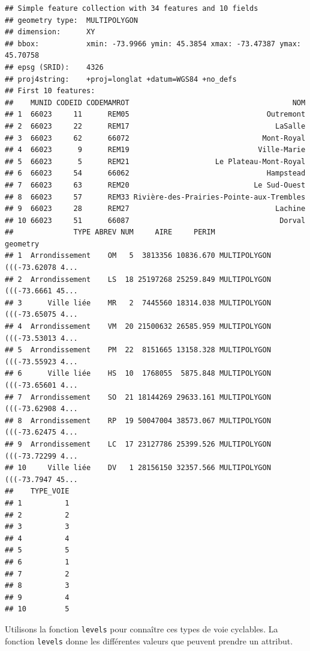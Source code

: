 \documentclass[]{article}
\newenvironment{Shaded}{\begin{snugshade}}{\end{snugshade}}
\newcommand{\KeywordTok}[1]{\textcolor[rgb]{0.13,0.29,0.53}{\textbf{#1}}}
\newcommand{\OperatorTok}[1]{\textcolor[rgb]{0.81,0.36,0.00}{\textbf{#1}}}
\newcommand{\NormalTok}[1]{#1}
\begin{document}
\begin{verbatim}
## Simple feature collection with 34 features and 10 fields
## geometry type:  MULTIPOLYGON
## dimension:      XY
## bbox:           xmin: -73.9966 ymin: 45.3854 xmax: -73.47387 ymax: 45.70758
## epsg (SRID):    4326
## proj4string:    +proj=longlat +datum=WGS84 +no_defs
## First 10 features:
##    MUNID CODEID CODEMAMROT                                      NOM
## 1  66023     11      REM05                                Outremont
## 2  66023     22      REM17                                  LaSalle
## 3  66023     62      66072                               Mont-Royal
## 4  66023      9      REM19                              Ville-Marie
## 5  66023      5      REM21                    Le Plateau-Mont-Royal
## 6  66023     54      66062                                Hampstead
## 7  66023     63      REM20                             Le Sud-Ouest
## 8  66023     57      REM33 Rivière-des-Prairies-Pointe-aux-Trembles
## 9  66023     28      REM27                                  Lachine
## 10 66023     51      66087                                   Dorval
##              TYPE ABREV NUM     AIRE     PERIM                       geometry
## 1  Arrondissement    OM   5  3813356 10836.670 MULTIPOLYGON (((-73.62078 4...
## 2  Arrondissement    LS  18 25197268 25259.849 MULTIPOLYGON (((-73.6661 45...
## 3      Ville liée    MR   2  7445560 18314.038 MULTIPOLYGON (((-73.65075 4...
## 4  Arrondissement    VM  20 21500632 26585.959 MULTIPOLYGON (((-73.53013 4...
## 5  Arrondissement    PM  22  8151665 13158.328 MULTIPOLYGON (((-73.55923 4...
## 6      Ville liée    HS  10  1768055  5875.848 MULTIPOLYGON (((-73.65601 4...
## 7  Arrondissement    SO  21 18144269 29633.161 MULTIPOLYGON (((-73.62908 4...
## 8  Arrondissement    RP  19 50047004 38573.067 MULTIPOLYGON (((-73.62475 4...
## 9  Arrondissement    LC  17 23127786 25399.526 MULTIPOLYGON (((-73.72299 4...
## 10     Ville liée    DV   1 28156150 32357.566 MULTIPOLYGON (((-73.7947 45...
##    TYPE_VOIE
## 1          1
## 2          2
## 3          3
## 4          4
## 5          5
## 6          1
## 7          2
## 8          3
## 9          4
## 10         5
\end{verbatim}

Utilisons la fonction \texttt{levels} pour connaître ces types de voie
cyclables. La fonction \texttt{levels} donne les différentes valeurs que
peuvent prendre un attribut.

\begin{Shaded}
\end{Shaded}
\end{document}
